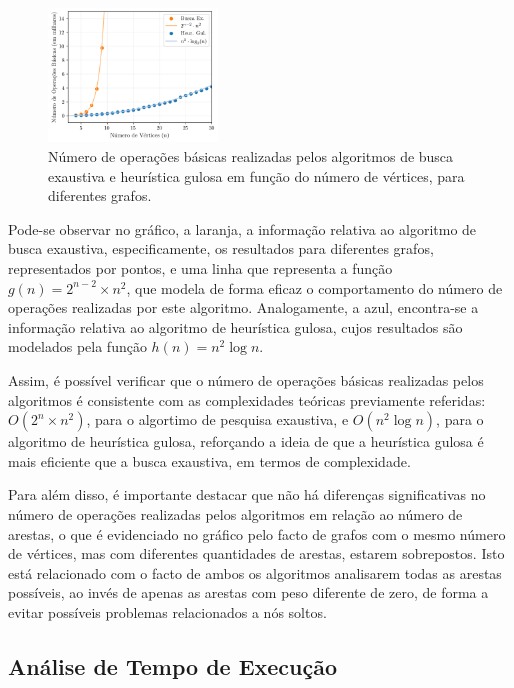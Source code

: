 \documentclass[mirror]{revdetua}
\begin{document}
\begin{figure}[h]
    \centering
    \includegraphics[width=0.4\textwidth]{../assets/numberOPS.png}
    \caption{Número de operações básicas realizadas pelos algoritmos de busca exaustiva e heurística gulosa em função do número de vértices, para diferentes grafos.}
    \label{fig:numeroops}
\end{figure}

Pode-se observar no gráfico, a laranja, a informação relativa ao algoritmo de busca exaustiva, especificamente, os resultados para diferentes grafos, representados por pontos, e uma linha que representa a função $g(n) = 2^{n-2} \times n^2$, que modela de forma eficaz o comportamento do número de operações realizadas por este algoritmo. Analogamente, a azul, encontra-se a informação relativa ao algoritmo de heurística gulosa, cujos resultados são modelados pela função $h(n) = n^2 \log n$.

Assim, é possível verificar que o número de operações básicas realizadas pelos algoritmos é consistente com as complexidades teóricas previamente referidas: $O(2^n \times n^2)$, para o algortimo de pesquisa exaustiva, e $O(n^2 \log n)$, para o algoritmo de heurística gulosa, reforçando a ideia de que a heurística gulosa é mais eficiente que a busca exaustiva, em termos de complexidade.

Para além disso, é importante destacar que não há diferenças significativas no número de operações realizadas pelos algoritmos em relação ao número de arestas, o que é evidenciado no gráfico pelo facto de grafos com o mesmo número de vértices, mas com diferentes quantidades de arestas, estarem sobrepostos. Isto está relacionado com o facto de ambos os algoritmos analisarem todas as arestas possíveis, ao invés de apenas as arestas com peso diferente de zero, de forma a evitar possíveis problemas relacionados a nós soltos.


\subsection{Análise de Tempo de Execução}
\end{document}
